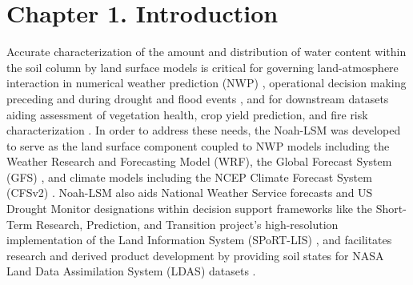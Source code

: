 
\chapter{Chapter 1. Introduction}%

Accurate characterization of the amount and distribution of water content within the soil column by land surface models is critical for governing land-atmosphere interaction in numerical weather prediction (NWP) \citep{brocca_spatial-temporal_2010} \citep{koster_contribution_2010}, operational decision making preceding and during drought and flood events \citep{otkin_assessing_2016}, and for downstream datasets aiding assessment of vegetation health, crop yield prediction, and fire risk characterization \citep{case_role_2023}. In order to address these needs, the Noah-LSM was developed to serve as the land surface component coupled to NWP models including the Weather Research and Forecasting Model (WRF), the Global Forecast System (GFS) \citep{jin_sensitivity_2010} \citep{mitchell_ncep_2005}, and climate models including the NCEP Climate Forecast System (CFSv2) \citep{saha_ncep_2014}. Noah-LSM also aids National Weather Service forecasts and US Drought Monitor designations within decision support frameworks like the Short-Term Research, Prediction, and Transition project's high-resolution implementation of the Land Information System (SPoRT-LIS) \citep{case_nasa_2022} \citep{case_assessment_2014}, and facilitates research and derived product development by providing soil states for NASA Land Data Assimilation System (LDAS) datasets \citep{ek_implementation_2003}.

